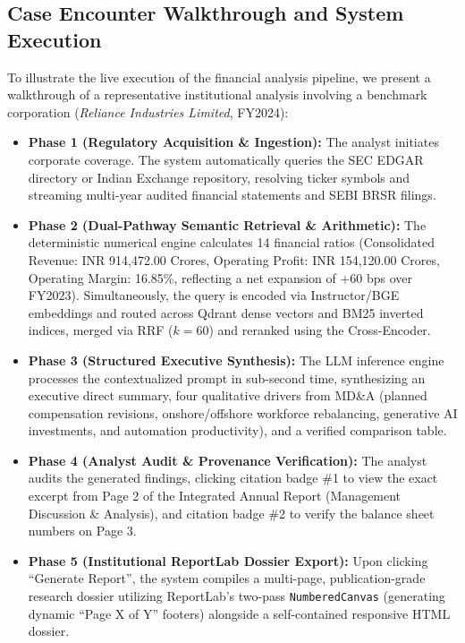 \documentclass[conference]{IEEEtran}
\begin{document}
\subsection{Case Encounter Walkthrough and System Execution}
To illustrate the live execution of the financial analysis pipeline, we present a walkthrough of a representative institutional analysis involving a benchmark corporation (\textit{Reliance Industries Limited}, FY2024):
\begin{itemize}
    \item \textbf{Phase 1 (Regulatory Acquisition \& Ingestion):} The analyst initiates corporate coverage. The system automatically queries the SEC EDGAR directory or Indian Exchange repository, resolving ticker symbols and streaming multi-year audited financial statements and SEBI BRSR filings.
    \item \textbf{Phase 2 (Dual-Pathway Semantic Retrieval \& Arithmetic):} The deterministic numerical engine calculates 14 financial ratios (Consolidated Revenue: INR 914,472.00 Crores, Operating Profit: INR 154,120.00 Crores, Operating Margin: 16.85\%, reflecting a net expansion of +60 bps over FY2023). Simultaneously, the query is encoded via Instructor/BGE embeddings and routed across Qdrant dense vectors and BM25 inverted indices, merged via RRF ($k=60$) and reranked using the Cross-Encoder.
    \item \textbf{Phase 3 (Structured Executive Synthesis):} The LLM inference engine processes the contextualized prompt in sub-second time, synthesizing an executive direct summary, four qualitative drivers from MD\&A (planned compensation revisions, onshore/offshore workforce rebalancing, generative AI investments, and automation productivity), and a verified comparison table.
    \item \textbf{Phase 4 (Analyst Audit \& Provenance Verification):} The analyst audits the generated findings, clicking citation badge \#1 to view the exact excerpt from Page 2 of the Integrated Annual Report (Management Discussion \& Analysis), and citation badge \#2 to verify the balance sheet numbers on Page 3.
    \item \textbf{Phase 5 (Institutional ReportLab Dossier Export):} Upon clicking ``Generate Report'', the system compiles a multi-page, publication-grade research dossier utilizing ReportLab's two-pass \texttt{NumberedCanvas} (generating dynamic ``Page X of Y'' footers) alongside a self-contained responsive HTML dossier.
\end{itemize}
\end{document}
